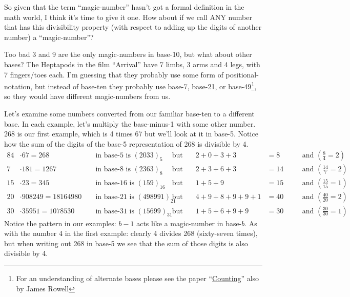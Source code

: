 \documentclass{article}
\begin{document}
So given that the term ``magic-number'' hasn't got
a formal definition in the math world, I think it's time to give it one.
How about if we call ANY number that has this
divisibility property (with respect to adding up the digits of another number) a ``magic-number''?

Too bad 3 and 9 are the only magic-numbers in base-10,
but what about other bases?
The Heptapods in the film ``Arrival'' have 7 limbs, 3 arms and 4 legs, with 7 fingers/toes each.
I'm guessing that they probably use some form of positional-notation,
but instead of base-ten they probably use base-7, base-21,
or base-49\footnote{For an understanding of alternate bases please see
the paper ``\href {https://www.dropbox.com/s/bwmrffmkcidnf27/basisReprThm.pdf?dl=0}
{Counting}'' also by James Rowell}, so they would have different magic-numbers from us.

Let's examine some numbers converted from our familiar base-ten
to a different base.
In each example, let's multiply the base-minus-1 with some other number.
268 is our first example, which is 4 times 67 but we'll look at it in base-5.
Notice how the sum of the digits of the base-5
representation of 268 is divisible by 4.
\begin{alignat*}{8}
 4&\cdot{}67=268          &&\text{ in base-5 is } (2033)_5       &&\quad\text{but}\quad &     2+0+3+3&=8  &&\quad\text{and } (\tfrac{8}{4}=2) \\
 7&\cdot{}181=1267        &&\text{ in base-8 is } (2363)_8       &&\quad\text{but}\quad &     2+3+6+3&=14 &&\quad\text{and } (\tfrac{14}{7}=2) \\
15&\cdot{}23=345          &&\text{ in base-16 is } (159)_{16}    &&\quad\text{but}\quad &       1+5+9&=15 &&\quad\text{and } (\tfrac{15}{15}=1) \\
20&\cdot{}908249=18164980 &&\text{ in base-21 is } (498991)_{21} &&\quad\text{but}\quad & 4+9+8+9+9+1&=40 &&\quad\text{and } (\tfrac{40}{20}=2) \\
30&\cdot{}35951=1078530   &&\text{ in base-31 is } (15699)_{31}  &&\quad\text{but}\quad &   1+5+6+9+9&=30 &&\quad\text{and } (\tfrac{30}{30}=1)
\end{alignat*}
Notice the pattern in our examples:
$b-1$ acts like a magic-number in base-$b$.
As with the number 4 in the first example:
clearly 4 divides 268 (sixty-seven times),
but when writing out 268 in base-5 we see that the sum of those digits is also divisible by 4.
\end{document}
